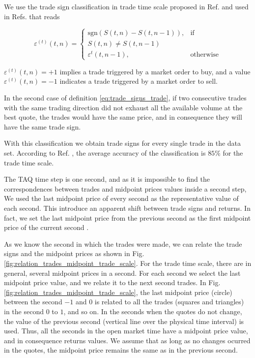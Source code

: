 We use the trade sign classification in trade time scale proposed in Ref.
\cite{Wang_2016_cross} and used in Refs.
\cite{Wang_2017,Wang_2018_copulas,Wang_2016_avg} that reads

\begin{equation}\label{eq:trade_signs_trade}
    \varepsilon^{\left(t\right)}\left(t,n\right)=\left\{
    \begin{array}{cc}
    \text{sgn}\left(S\left(t,n\right)-S\left(t,n-1\right)\right),
    & \text{if }\\ S\left(t,n\right) \ne S\left(t,n-1\right)\\
    \varepsilon^{t}\left(t,n-1\right),
    & \text{otherwise}
    \end{array}\right.
\end{equation}

$\varepsilon^{\left(t\right)}\left( t,n \right) = +1$ implies a trade triggered
by a market order to buy, and a value
$\varepsilon^{\left(t\right)}\left( t,n \right) = -1$ indicates a trade
triggered by a market order to sell.

In the second case of definition \ref{eq:trade_signs_trade}, if two consecutive
trades with the same trading direction did not exhaust all the available volume
at the best quote, the trades would have the same price, and in consequence
they will have the same trade sign.

With this classification we obtain trade signs for every single trade in the
data set. According to Ref. \cite{Wang_2016_cross}, the average accuracy of the
classification is $85\%$ for the trade time scale.

The TAQ time step is one second, and as it is impossible to find the
correspondences between trades and midpoint prices values inside a second step,
We used the last midpoint price of every second as the representative value of
each second. This introduce an apparent shift between trade signs and returns.
In fact, we set the last midpoint price from the previous second as the first
midpoint price of the current second \cite{Wang_2016_cross}.

As we know the second in which the trades were made, we can relate the trade
signs and the midpoint prices as shown in Fig.
\ref{fig:relation_trades_midpoint_trade_scale}. For the trade time scale, there
are in general, several midpoint prices in a second. For each second we select
the last midpoint price value, and we relate it to the next second trades. In
Fig. \ref{fig:relation_trades_midpoint_trade_scale}, the last midpoint price
(circle) between the second $-1$ and $0$ is related to all the trades (squares
and triangles) in the second $0$ to $1$, and so on. In the seconds when the
quotes do not change, the value of the previous second (vertical line over the
physical time interval) is used. Thus, all the seconds in the open market time
have a midpoint price value, and in consequence returns values. We assume that
as long as no changes ocurred in the quotes, the midpoint price remains the
same as in the previous second.

